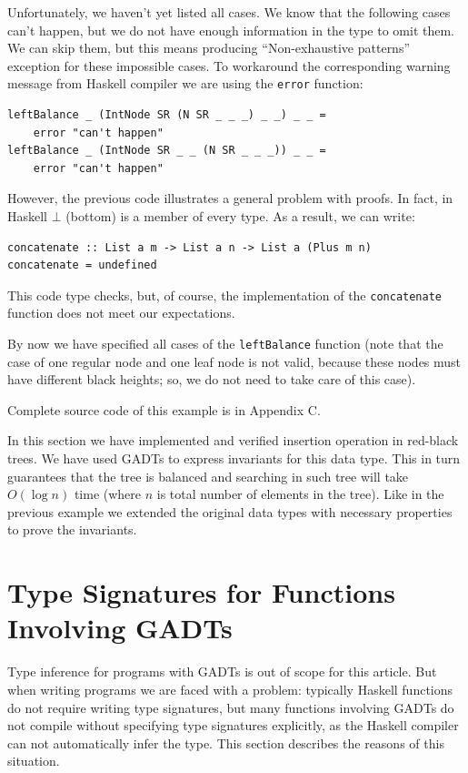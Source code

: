 \documentclass{tmr}
\begin{document}
Unfortunately, we haven't yet listed all cases. We know that the following cases can't happen, but we do not have enough information in the type to omit them. We can skip them, but this means producing ``Non-exhaustive patterns'' exception for these impossible cases. To workaround the corresponding warning message from Haskell compiler we are using the \verb|error| function:

\begin{Verbatim}
leftBalance _ (IntNode SR (N SR _ _ _) _ _) _ _ =
    error "can't happen"
leftBalance _ (IntNode SR _ _ (N SR _ _ _)) _ _ =
    error "can't happen"
\end{Verbatim}

However, the previous code illustrates a general problem with proofs. In fact, in Haskell $\bot$ (bottom) is a member of every type. As a result, we can write:

\begin{Verbatim}
concatenate :: List a m -> List a n -> List a (Plus m n)
concatenate = undefined
\end{Verbatim}

This code type checks, but, of course, the implementation of the \verb|concatenate| function does not meet our expectations.

By now we have specified all cases of the \verb|leftBalance| function (note that the case of one regular node and one leaf node is not valid, because these nodes must have different black heights; so, we do not need to take care of this case).

Complete source code of this example is in Appendix C.

In this section we have implemented and verified insertion operation in red-black trees. We have used GADTs to express invariants for this data type. This in turn guarantees that the tree is balanced and searching in such tree will take $O (\log n)$ time (where $n$ is total number of elements in the tree). Like in the previous example we extended the original data types with necessary properties to prove the invariants.

\section{Type Signatures for Functions Involving GADTs}
\label{sec:type_signatures}

Type inference for programs with GADTs is out of scope for this article. But when writing programs we are faced with a problem: typically Haskell functions do not require writing type signatures, but many functions involving GADTs do not compile without specifying type signatures explicitly, as the Haskell compiler can not automatically infer the type. This section describes the reasons of this situation.
\end{document}
